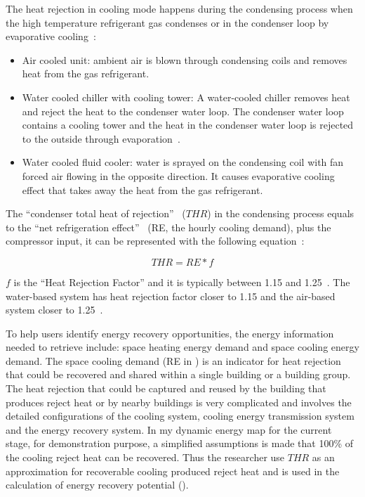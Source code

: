 The heat rejection in cooling mode happens during the condensing
process when the high temperature refrigerant gas condenses or in the
condenser loop by evaporative cooling~\cite{Bhatia2015}:
\begin{itemize}
\item Air cooled unit: ambient air is blown through condensing coils
  and removes heat from the gas refrigerant.
\item Water cooled chiller with cooling tower: A water-cooled chiller
  removes heat and reject the heat to the condenser water loop. The
  condenser water loop contains a cooling tower and the heat in the
  condenser water loop is rejected to the outside through
  evaporation~\cite{coolingTower2015}.
\item Water cooled fluid cooler: water is sprayed on the condensing
  coil with fan forced air flowing in the opposite direction. It
  causes evaporative cooling effect that takes away the heat from the
  gas refrigerant.
\end{itemize}
The ``condenser total heat of rejection''~\cite{Bhatia2015} ($\mathit{THR}$) in
the condensing process equals to the ``net refrigeration effect''
~\cite{Bhatia2015}(RE, the hourly cooling demand), plus the compressor
input, it can be represented with the following equation~\cite{Bhatia2015}:

\begin{equation}\label{eq:reject}
\mathit{THR} = RE * f 
\end{equation}

$f$ is the ``Heat Rejection Factor'' and it is typically between 1.15
and 1.25~\cite{Bhatia2015}. The water-based system has heat rejection
factor closer to 1.15 and the air-based system closer to
1.25~\cite{Bhatia2015}.

To help users identify energy recovery opportunities, the energy
information needed to retrieve include: space heating energy demand
and space cooling energy demand. The space cooling demand (RE in
) is an indicator for heat rejection that could be
recovered and shared within a single building or a building group. The
heat rejection that could be captured and reused by the building that
produces reject heat or by nearby buildings is very complicated and
involves the detailed configurations of the cooling system, cooling
energy transmission system and the energy recovery system. In my
dynamic energy map for the current stage, for demonstration purpose, a
simplified assumptions is made that 100\% of the cooling reject heat
can be recovered. Thus the researcher use $\mathit{THR}$ as an approximation for recoverable
cooling produced reject heat and is used in the calculation of energy
recovery potential ().

